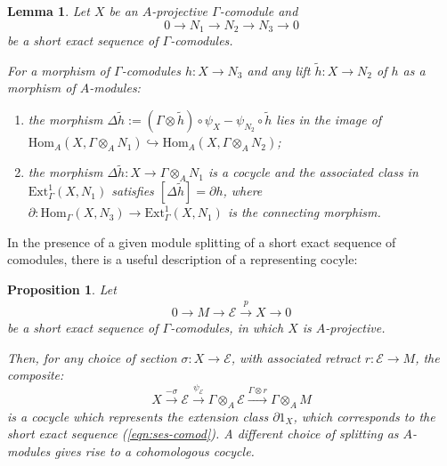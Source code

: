 \documentclass[10pt,a4paper]{amsart}
\newtheorem{prop}[thm]{Proposition}
\newtheorem{lem}[thm]{Lemma}
\theoremstyle{definition}
\theoremstyle{remark}
\renewcommand{\hom}{\mathrm{Hom}}
\newcommand{\ext}{\mathrm{Ext}}
\begin{document}
\begin{lem}
\label{lem:explicit-connecting}
	Let  $X$ be an $A$-projective $\Gamma$-comodule and
\[
	0
\rightarrow
N_1
\rightarrow
N_2
\rightarrow
N_3
\rightarrow
0
\]
be a short exact sequence of $\Gamma$-comodules.

For a morphism of $\Gamma$-comodules $h : X \rightarrow N_3$ and any lift
$\tilde{h}: X\rightarrow N_2$ of $h$ as a morphism of $A$-modules:
\begin{enumerate}
	\item
the morphism $\Delta \tilde{h}:= (\Gamma \otimes \tilde{h}) \circ \psi_X - \psi_{N_2} \circ \tilde{h}$
lies in the image of $\hom_A (X, \Gamma \otimes_A N_1 ) \hookrightarrow \hom_A (X, \Gamma \otimes_A N_2)$;
\item
the morphism $\Delta \tilde{h} : X \rightarrow \Gamma \otimes_A N_1$ is a cocycle and the associated class in $\ext^1 _\Gamma (X, N_1)$ satisfies
$[\Delta \tilde{h}] = \partial h$, where $\partial : \hom_\Gamma (X, N_3) \rightarrow \ext^1_\Gamma (X, N_1)$
is the connecting morphism.
\end{enumerate}
\end{lem}


In the presence of a given module splitting of a short exact sequence of comodules,
there is a useful description of a representing cocyle:



\begin{prop}
\label{prop:cocycle-canonical-splitting}
Let
\begin{eqnarray}
\label{eqn:ses-comod}
0 \rightarrow M
\rightarrow
\mathcal{E}
\stackrel{p}{\rightarrow}
X
\rightarrow
0
\end{eqnarray}
be a short exact sequence of $\Gamma$-comodules, in which $X$ is $A$-projective.

Then, for any choice of section $\sigma : X \rightarrow \mathcal{E}$, with associated
retract  $r :\mathcal{E}\rightarrow M$,  the composite:
\[
X \stackrel{- \sigma}{\rightarrow}
\mathcal{E}
\stackrel{\psi_{\mathcal{E}}}{\rightarrow}
\Gamma \otimes _A \mathcal{E}
\stackrel{\Gamma \otimes r}{\rightarrow}
\Gamma \otimes_A M
\]
is a cocycle which represents the extension class $\partial 1_X$, which corresponds to the short exact sequence (\ref{eqn:ses-comod}). A different choice of splitting as $A$-modules gives rise to a cohomologous cocycle.
\end{prop}
\end{document}
